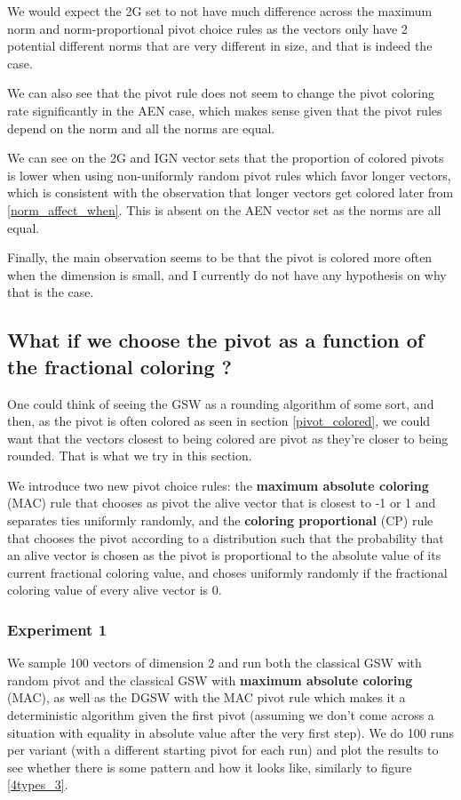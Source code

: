 \documentclass[12pt]{article}
\begin{document}
We would expect the 2G set to not have much difference across the maximum norm and norm-proportional pivot choice rules as the vectors only have 2 potential different norms that are very different in size, and that is indeed the case.

We can also see that the pivot rule does not seem to change the pivot coloring rate significantly in the AEN case, which makes sense given that the pivot rules depend on the norm and all the norms are equal.

We can see on the 2G and IGN vector sets that the proportion of colored pivots is lower when using non-uniformly random pivot rules which favor longer vectors, which is consistent with the observation that longer vectors get colored later from \ref{norm_affect_when}. This is absent on the AEN vector set as the norms are all equal.

Finally, the main observation seems to be that the pivot is colored more often when the dimension is small, and I currently do not have any hypothesis on why that is the case.

\subsection{What if we choose the pivot as a function of the fractional coloring ?}\label{pivot_coloring_rules}
One could think of seeing the GSW as a rounding algorithm of some sort, and then, as the pivot is often colored as seen in section \ref{pivot_colored}, we could want that the vectors closest to being colored are pivot as they're closer to being rounded. That is what we try in this section.%

We introduce two new pivot choice rules: the \textbf{maximum absolute coloring} (MAC) rule that chooses as pivot the alive vector that is closest to -1 or 1 and separates ties uniformly randomly, and the \textbf{coloring proportional} (CP) rule that chooses the pivot according to a distribution such that the probability that an alive vector is chosen as the pivot is proportional to the absolute value of its current fractional coloring value, and choses uniformly randomly if the fractional coloring value of every alive vector is 0.

\subsubsection{Experiment 1}\label{exp_plot_max_col}
We sample 100 vectors of dimension 2 and run both the classical GSW with random pivot and the classical GSW with \textbf{maximum absolute coloring} (MAC), as well as the DGSW with the MAC pivot rule which makes it a deterministic algorithm given the first pivot (assuming we don't come across a situation with equality in absolute value after the very first step). We do 100 runs per variant (with a different starting pivot for each run) and plot the results to see whether there is some pattern and how it looks like, similarly to figure \ref{4types_3}.
\end{document}
